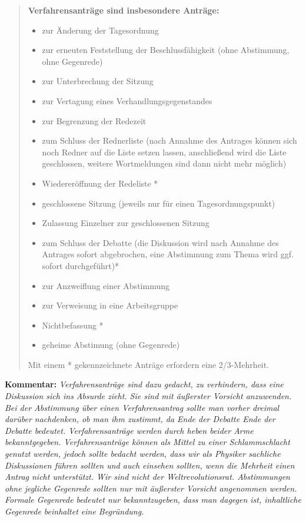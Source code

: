 \begin{enumerate}
\begin{quote}
\textbf{Verfahrensanträge sind insbesondere Anträge:}
\begin{itemize}
\item{zur Änderung der Tagesordnung}
\item{zur erneuten Feststellung der Beschlussfähigkeit (ohne Abstimmung, ohne Gegenrede)}
\item{zur Unterbrechung der Sitzung}
\item{zur Vertagung eines Verhandlungsgegenstandes}
\item{zur Begrenzung der Redezeit}
\item{zum Schluss der Rednerliste (nach Annahme des Antrages können sich noch Redner auf die Liste
setzen lassen, anschließend wird die Liste geschlossen, weitere Wortmeldungen sind dann nicht
mehr möglich)}
\item{Wiedereröffnung der Redeliste *}
\item{geschlossene Sitzung (jeweils nur für einen Tagesordnungspunkt)}
\item{Zulassung Einzelner zur geschlossenen Sitzung}
\item{zum Schluss der Debatte (die Diskussion wird nach Annahme des Antrages sofort abgebrochen, eine
Abstimmung zum Thema wird ggf. sofort durchgeführt)*}
\item{zur Anzweiflung einer Abstimmung}
\item{zur Verweisung in eine Arbeitsgruppe}
\item{Nichtbefassung *}
\item{geheime Abstimung (ohne Gegenrede)}

\end{itemize}
Mit einem * gekennzeichnete Anträge erfordern eine 2/3-Mehrheit.
\end{quote}
\end{enumerate}
\textbf{Kommentar:}
{\footnotesize\textit{Verfahrensanträge sind dazu gedacht, zu verhindern, dass eine Diskussion sich ins
Absurde zieht. Sie sind mit äußerster Vorsicht anzuwenden. Bei der Abstimmung über einen
Verfahrensantrag sollte man vorher dreimal darüber nachdenken, ob man ihm zustimmt, da Ende
der Debatte Ende der Debatte bedeutet. Verfahrensanträge werden durch heben beider Arme
bekanntgegeben. Verfahrensanträge können als Mittel zu einer Schlammschlacht genutzt werden,
jedoch sollte bedacht werden, dass wir als Physiker sachliche Diskussionen führen sollten und auch
einsehen sollten, wenn die Mehrheit einen Antrag nicht unterstützt. Wir sind nicht der
Weltrevolutionsrat. Abstimmungen ohne jegliche Gegenrede sollten nur mit äußerster Vorsicht
angenommen werden. Formale Gegenrede bedeutet nur bekanntzugeben, dass man dagegen ist,
inhaltliche Gegenrede beinhaltet eine Begründung.}}\\[1ex]

